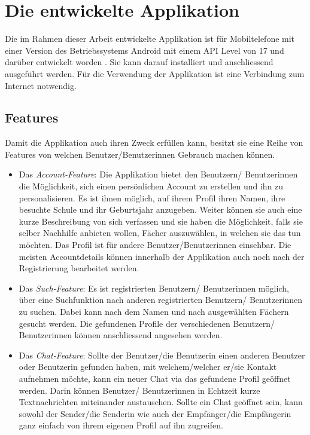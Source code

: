 \documentclass[../main.tex]{subfiles}
\begin{document}
\chapter{Die entwickelte Applikation}
Die im Rahmen dieser Arbeit entwickelte Applikation ist für Mobiltelefone mit einer Version des Betriebssystems Android mit einem API Level von 17 und darüber entwickelt worden \cite{android:APILevel}. Sie kann darauf installiert und anschliessend ausgeführt werden. Für die Verwendung der Applikation ist eine Verbindung zum Internet notwendig.

\section{Features}
Damit die Applikation auch ihren Zweck erfüllen kann, besitzt sie eine Reihe von Features von welchen Benutzer/Benutzerinnen Gebrauch machen können.

\begin{itemize}
	\item Das \emph{Account-Feature}: Die Applikation bietet den Benutzern/ Benutzerinnen die Möglichkeit, sich einen persönlichen Account zu erstellen und ihn zu personalisieren. Es ist ihnen möglich, auf ihrem Profil ihren Namen, ihre besuchte Schule und ihr Geburtsjahr anzugeben. Weiter können sie auch eine kurze Beschreibung von sich verfassen und sie haben die Möglichkeit, falls sie selber Nachhilfe anbieten wollen, Fächer auszuwählen, in welchen sie das tun möchten. Das Profil ist für andere Benutzer/Benutzerinnen einsehbar. Die meisten Accountdetails können innerhalb der Applikation auch noch nach der Registrierung bearbeitet werden.
	\item Das \emph{Such-Feature}: Es ist registrierten Benutzern/ Benutzerinnen möglich, über eine Suchfunktion nach anderen registrierten Benutzern/ Benutzerinnen zu suchen. Dabei kann nach dem Namen und nach ausgewählten Fächern gesucht werden. Die gefundenen Profile der verschiedenen Benutzern/ Benutzerinnen können anschliessend angesehen werden.
	\item Das \emph{Chat-Feature}: Sollte der Benutzer/die Benutzerin einen anderen Benutzer oder Benutzerin gefunden haben, mit welchem/welcher er/sie Kontakt aufnehmen möchte, kann ein neuer Chat via das gefundene Profil geöffnet werden. Darin können Benutzer/ Benutzerinnen in Echtzeit kurze Textnachrichten miteinander austauschen. Sollte ein Chat geöffnet sein, kann sowohl der Sender/die Senderin wie auch der Empfänger/die Empfängerin ganz einfach von ihrem eigenen Profil auf ihn zugreifen.
\end{itemize}
\end{document}

